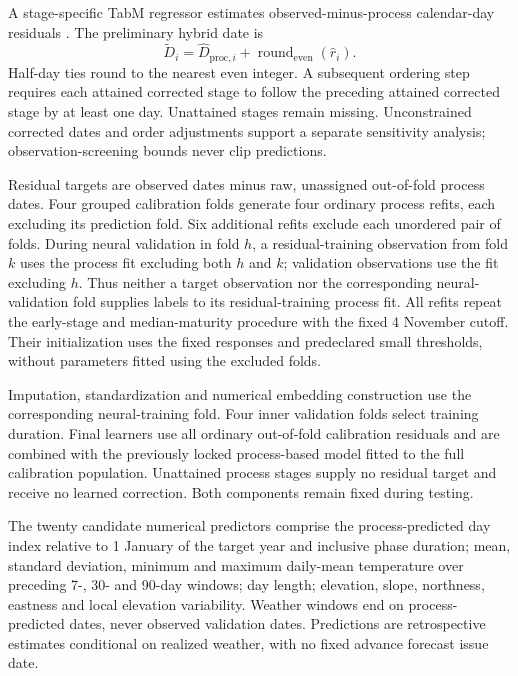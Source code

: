 \documentclass[a4paper,12pt]{article}
\begin{document}
A stage-specific TabM regressor estimates observed-minus-process calendar-day
residuals \citep{gorishniyTabMAdvancingTabular2025}. The preliminary hybrid date is
\begin{equation}
\widetilde D_i=\widehat D_{\mathrm{proc},i}
+\operatorname{round}_{\mathrm{even}}(\widehat r_i).
\label{eq:residual_hybrid}
\end{equation}
Half-day ties round to the nearest even integer. A subsequent ordering step
requires each attained corrected stage to follow the preceding attained
corrected stage by at least one day. Unattained stages remain missing.
Unconstrained corrected dates and order adjustments support a separate
sensitivity analysis; observation-screening bounds never clip predictions.

Residual targets are observed dates minus raw, unassigned out-of-fold process dates. Four grouped calibration folds generate four ordinary process refits, each excluding its prediction fold. Six additional refits exclude each unordered pair of folds. During neural validation in fold $h$, a residual-training observation from fold $k$ uses the process fit excluding both $h$ and $k$; validation observations use the fit excluding $h$. Thus neither a target observation nor the corresponding neural-validation fold supplies labels to its residual-training process fit. All refits repeat the early-stage and median-maturity procedure with the fixed 4 November cutoff. Their initialization uses the fixed responses and predeclared small thresholds, without parameters fitted using the excluded folds.

Imputation, standardization and numerical embedding construction use the corresponding neural-training fold. Four inner validation folds select training duration. Final learners use all ordinary out-of-fold calibration residuals and are combined with the previously locked process-based model fitted to the full calibration population. Unattained process stages supply no residual target and receive no learned correction. Both components remain fixed during testing.

The twenty candidate numerical predictors comprise the process-predicted day
index relative to 1 January of the target year and inclusive phase duration;
mean, standard deviation, minimum and maximum daily-mean
temperature over preceding 7-, 30- and 90-day windows; day length; elevation,
slope, northness, eastness and local elevation variability. Weather windows
end on process-predicted dates, never observed validation dates. Predictions
are retrospective estimates conditional on realized weather, with no fixed
advance forecast issue date.
\end{document}
